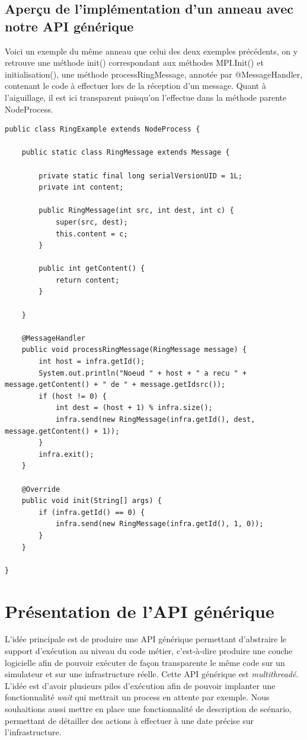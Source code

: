 \documentclass{article}
\begin{document}
			\subsection{Aperçu de l'implémentation d'un anneau avec notre API générique}
				Voici un exemple du même anneau que celui des deux exemples précédents, on y retrouve une méthode init() correspondant aux méthodes MPI.Init() et initialisation(),
une méthode processRingMessage, annotée par @MessageHandler, contenant le code à effectuer lors de la réception d'un message. Quant à l'aiguillage, il est ici transparent puisqu'on l'effectue dans la méthode parente NodeProcess.
				\begin{lstlisting}
public class RingExample extends NodeProcess {

	public static class RingMessage extends Message {

		private static final long serialVersionUID = 1L;
		private int content;

		public RingMessage(int src, int dest, int c) {
			super(src, dest);
			this.content = c;
		}

		public int getContent() {
			return content;
		}

	}

	@MessageHandler
	public void processRingMessage(RingMessage message) {
		int host = infra.getId();
		System.out.println("Noeud " + host + " a recu " + message.getContent() + " de " + message.getIdsrc());
		if (host != 0) {
			int dest = (host + 1) % infra.size();
			infra.send(new RingMessage(infra.getId(), dest, message.getContent() + 1));
		}
		infra.exit();
	}

	@Override
	public void init(String[] args) {
		if (infra.getId() == 0) {
			infra.send(new RingMessage(infra.getId(), 1, 0));
		}
	}

}
				\end{lstlisting}
				\newpage

				\section{Présentation de l'API générique}

				L'idée principale est de produire une API générique permettant d'abstraire le support d'exécution au niveau du code métier, c'est-à-dire produire une couche logicielle afin de pouvoir exécuter de façon transparente le même code sur un simulateur et sur une infrastructure réelle.	
				\newline
				Cette API générique est \emph{multithreadé}. L'idée est d'avoir plusieurs piles d'exécution afin de pouvoir implanter une fonctionnalité \emph{wait} qui mettrait un process en attente par exemple.
				\newline
				Nous souhaitions aussi mettre en place une fonctionnalité de description de scénario, permettant de détailler des actions à effectuer à une date précise sur l'infrastructure.
\end{document}
